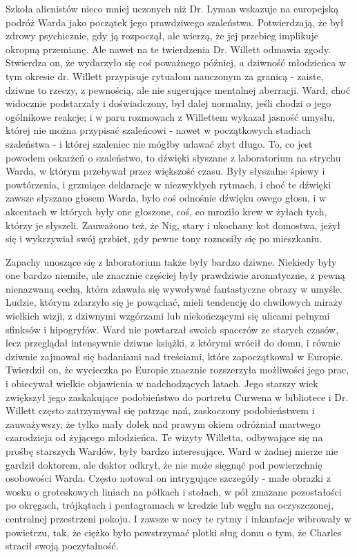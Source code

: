 Szkoła alienistów nieco mniej uczonych niż Dr. Lyman wskazuje na europejską podróż Warda jako początek jego prawdziwego szaleństwa. Potwierdzają, że był zdrowy psychicznie, gdy ją rozpoczął, ale wierzą, że jej przebieg implikuje okropną przemianę. Ale nawet na te twierdzenia Dr. Willett odmawia zgody. Stwierdza on, że wydarzyło się coś poważnego później, a  dziwność młodzieńca w tym okresie dr. Willett przypisuje rytuałom nauczonym za granicą - zaiste, dziwne to rzeczy, z pewnością, ale nie sugerujące mentalnej aberracji. Ward, choć widocznie podstarzały i doświadczony, był dalej normalny, jeśli chodzi o jego ogólnikowe reakcje; i w paru rozmowach z Willettem wykazał jasność umysłu, której nie można przypisać szaleńcowi - nawet w początkowych stadiach szaleństwa - i której szaleniec nie mógłby udawać zbyt długo. To, co jest powodem oskarżeń o szaleństwo, to dźwięki słyszane z laboratorium na strychu Warda, w którym przebywał przez większość czasu. Były słyszalne śpiewy i powtórzenia, i grzmiące deklaracje w niezwykłych rytmach, i choć te dźwięki zawsze słyszano głosem Warda, było coś odnośnie dźwięku owego głosu, i w akcentach w których były one głoszone, coś, co mroziło krew w żyłach tych, którzy je słyszeli. Zauważono też, że Nig, stary i ukochany kot domostwa, jeżył się i wykrzywiał swój grzbiet, gdy pewne tony roznosiły się po mieszkaniu. 

Zapachy unoszące się z laboratorium także były bardzo dziwne. Niekiedy były one bardzo niemiłe, ale znacznie częściej były prawdziwie aromatyczne, z pewną nienazwaną cechą, która zdawała się wywoływać fantastyczne obrazy w umyśle. Ludzie, którym zdarzyło się je powąchać, mieli tendencję do chwilowych miraży wielkich wizji, z dziwnymi wzgórzami lub niekończącymi się ulicami pełnymi sfinksów i hipogryfów. Ward nie powtarzał swoich spacerów ze starych czasów, lecz przeglądał intensywnie dziwne książki, z którymi wrócił do domu, i równie dziwnie zajmował się badaniami nad treściami, które zapoczątkował w Europie. Twierdził on, że wycieczka po Europie znacznie rozszerzyła możliwości jego prac, i obiecywał wielkie objawienia w nadchodzących latach. Jego starszy wiek zwiększył jego zaskakujące podobieństwo do portretu Curwena w bibliotece i Dr. Willett często zatrzymywał się patrząc nań, zaskoczony podobieństwem i zauważywszy, że tylko mały dołek nad prawym okiem odróżniał martwego czarodzieja od żyjącego młodzieńca. Te wizyty Willetta, odbywające się na prośbę starszych Wardów, były bardzo interesujące. Ward w żadnej mierze nie gardził doktorem, ale doktor odkrył, że nie może sięgnąć pod powierzchnię osobowości Warda. Często notował on intrygujące szczegóły - małe obrazki z wosku o groteskowych liniach na półkach i stołach, w pół zmazane pozostałości po okręgach, trójkątach i pentagramach w kredzie lub węglu na oczyszczonej, centralnej przestrzeni pokoju. I zawsze w nocy te rytmy i inkantacje wibrowały w powietrzu, tak, że ciężko było powstrzymać plotki sług domu o tym, że Charles stracił swoją poczytalność. 

